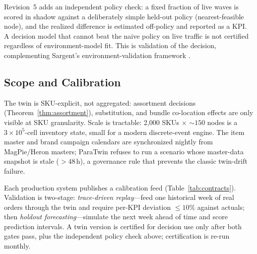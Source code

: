 \documentclass[10pt,twocolumn,letterpaper]{article}
\theoremstyle{definition}
\begin{document}
Revision~5 adds an independent policy check: a fixed fraction of live waves is scored in shadow against a deliberately simple held-out policy (nearest-feasible node), and the realized difference is estimated off-policy \cite{li2011} and reported as a KPI. A decision model that cannot beat the naive policy on live traffic is not certified regardless of environment-model fit. This is validation of the decision, complementing Sargent's environment-validation framework \cite{sargent2013}.

\subsection{Scope and Calibration}
The twin is SKU-explicit, not aggregated: assortment decisions (Theorem~\ref{thm:assortment}), substitution, and bundle co-location effects are only visible at SKU granularity. Scale is tractable: 2,000 SKUs $\times$ ${\sim}150$ nodes is a $3\times10^5$-cell inventory state, small for a modern discrete-event engine. The item master and brand campaign calendars are synchronized nightly from MagPie/Heron masters; ParaTwin refuses to run a scenario whose master-data snapshot is stale ($>48$\,h), a governance rule that prevents the classic twin-drift failure.

Each production system publishes a calibration feed (Table~\ref{tab:contracts}). Validation is two-stage: \emph{trace-driven replay}---feed one historical week of real orders through the twin and require per-KPI deviation $\le10\%$ against actuals; then \emph{holdout forecasting}---simulate the next week ahead of time and score prediction intervals. A twin version is certified for decision use only after both gates pass, plus the independent policy check above; certification is re-run monthly.
\end{document}
